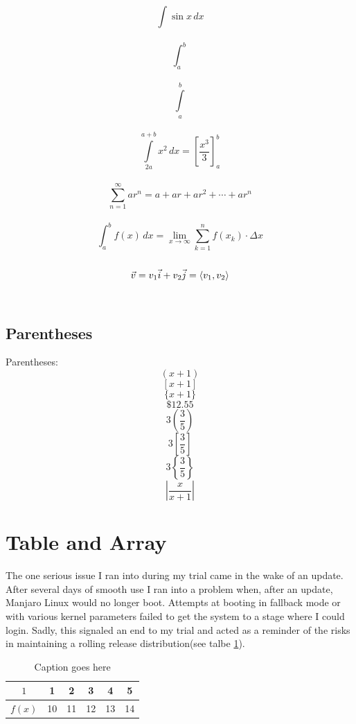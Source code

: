 \documentclass[11pt]{article}
\theoremstyle{definition}
\begin{document}
$$\displaystyle{\int \sin x\, dx }$$\\

$$\displaystyle{\int_a^b}$$\\

$$\displaystyle{\int \limits_a^b}$$\\

$$\displaystyle{\int \limits_{2a}^{a+b} x^2\,dx } =  \left[ \frac{x^3}{3} \right]_a^b$$\\

$$\displaystyle{\sum \limits_{n=1}^{\infty}ar^n = a+ar+ar^2+\cdots+ ar^n}$$\\

$$\displaystyle{\int_a^b f(x) \,dx =\lim \limits_{x \to \infty} \sum \limits_{k=1}^n f(x_k) \cdot \Delta x}$$\\

$$\vec{v} = v_1 \vec{i} + v_2 \vec{j} =\langle\\ v_1,v_2\rangle$$\\



	\subsection{Parentheses}
Parentheses:
$$(x+1)$$
$$[x+1]$$
$$\{x+1\}$$
$$\$12.55$$ 
$$3\left(\frac{3}{5}\right)$$ 
$$3\left[\frac{3}{5}\right]$$ 
$$3\left\{\frac{3}{5}\right\}$$ 
$$\left|\frac{x}{x+1}\right|$$

\section{Table and Array}
The one serious issue I ran into during my trial came in the wake of an update. After several days of smooth use I ran into a problem when, after an update, Manjaro Linux would no longer boot. Attempts at booting in fallback mode or with various kernel parameters failed to get the system to a stage where I could login. Sadly, this signaled an end to my trial and acted as a reminder of the risks in maintaining a rolling release distribution(see talbe \ref{tab:table1}). \\

\begin{table}[H] %
	\centering
		\begin{tabular}{|c|c|c|c|c|c|} \hline
		$1$ & 1 &  2 & 3 & 4 & 5 \\ \hline 
		$f(x)$ &10 & 11 & 12 & 13 & 14 \\ \hline
		\end{tabular}
	\caption{Caption goes here}
	\label{tab:table1}
\end{table}
\end{document}
